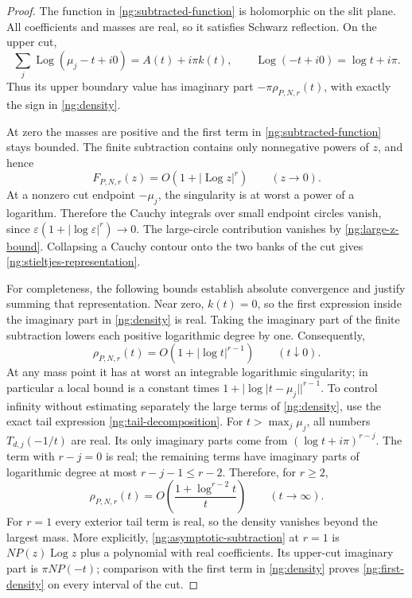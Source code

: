 \documentclass[11pt,letterpaper]{article}
\numberwithin{equation}{section}
\theoremstyle{definition}
\theoremstyle{remark}
\DeclareMathOperator{\Log}{Log}
\begin{document}
\begin{proof}
The function in \eqref{ng:subtracted-function} is holomorphic
on the slit plane.  All coefficients and masses are real, so
it satisfies Schwarz reflection.  On the upper cut,
\[
 \sum_j\Log(\mu_j-t+i0)=A(t)+i\pi k(t),\qquad
 \Log(-t+i0)=\log t+i\pi.
\]
Thus its upper boundary value has imaginary part
$-\pi\rho_{P,N,r}(t)$, with exactly the sign in
\eqref{ng:density}.

At zero the masses are positive and the first term in
\eqref{ng:subtracted-function} stays bounded.  The finite
subtraction contains only nonnegative powers of $z$, and hence
\[
 F_{P,N,r}(z)=O(1+|\Log z|^r)\qquad(z\to0).
\]
At a nonzero cut endpoint $-\mu_j$, the singularity is at worst
a power of a logarithm.  Therefore the Cauchy integrals over
small endpoint circles vanish, since
$\varepsilon(1+|\log\varepsilon|^r)\to0$.
The large-circle contribution vanishes by
\eqref{ng:large-z-bound}.  Collapsing a Cauchy contour onto the
two banks of the cut gives \eqref{ng:stieltjes-representation}.

For completeness, the following bounds establish absolute
convergence and justify summing that representation.  Near zero,
$k(t)=0$, so the first expression inside the imaginary part in
\eqref{ng:density} is real.  Taking the imaginary part of the
finite subtraction lowers each positive logarithmic degree
by one.  Consequently,
\begin{equation}
 \rho_{P,N,r}(t)=O(1+|\log t|^{r-1})\qquad(t\downarrow0).
 \label{ng:zero-bound}
\end{equation}
At any mass point it has at worst an integrable logarithmic
singularity; in particular a local bound is a constant times
$1+|\log|t-\mu_j||^{r-1}$.
To control infinity without estimating separately the large
terms of \eqref{ng:density}, use the exact tail expression
\eqref{ng:tail-decomposition}.
For $t>\max_j\mu_j$, all numbers $T_{d,j}(-1/t)$ are real.
Its only imaginary parts come from
$(\log t+i\pi)^{r-j}$.  The term with $r-j=0$ is real; the
remaining terms have imaginary parts of logarithmic degree at
most $r-j-1\leq r-2$.  Therefore, for $r\geq2$,
\begin{equation}
 \rho_{P,N,r}(t)
       =O\left(\frac{1+\log^{r-2}t}{t}\right)
                          \qquad(t\to\infty).
 \label{ng:infinity-bound}
\end{equation}
For $r=1$ every exterior tail term is real, so the density
vanishes beyond the largest mass.  More explicitly,
\eqref{ng:asymptotic-subtraction} at $r=1$ is
$NP(z)\Log z$ plus a polynomial with real coefficients.
Its upper-cut imaginary part is $\pi NP(-t)$; comparison with
the first term in \eqref{ng:density} proves
\eqref{ng:first-density} on every interval of the cut.


\end{proof}
\end{document}
